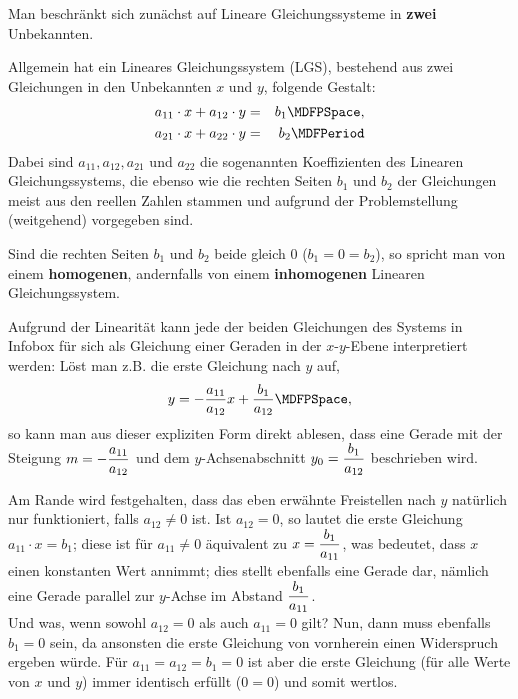 \begin{MIntro}
Man beschränkt sich zunächst auf Lineare Gleichungssysteme in \textbf{zwei}
Unbekannten.
\begin{MInfo}
Allgemein hat ein Lineares Gleichungssystem (LGS), bestehend aus zwei
Gleichungen in den Unbekannten $x$ und $y$, folgende Gestalt:
\begin{eqnarray*}
	a_{11} \cdot x + a_{12} \cdot y &=& b_{1} \MDFPSpace, \\ 
	a_{21} \cdot x + a_{22} \cdot y &=& b_2 \MDFPeriod
\end{eqnarray*}
Dabei sind $a_{11}, a_{12}, a_{21}$ und $a_{22}$ die sogenannten Koeffizienten des
Linearen Gleichungssystems,
die ebenso wie die rechten Seiten $b_1$ und $b_2$ der Gleichungen meist aus den reellen Zahlen stammen und
aufgrund der Problemstellung (weitgehend) vorgegeben sind.

Sind die rechten Seiten $b_1$ und $b_2$ beide gleich $0$ ($b_1 = 0 = b_2$), so spricht man von einem
\textbf{homogenen}, andernfalls von einem \textbf{inhomogenen} Linearen Gleichungssystem.

\end{MInfo}

Aufgrund der Linearität kann jede der beiden Gleichungen des Systems in Infobox  für sich als Gleichung
einer Geraden in der $x$-$y$-Ebene interpretiert werden: Löst man z.B. die erste Gleichung nach $y$ auf,
$$y = - \Mdfrac{a_{11}}{a_{12}} x + \Mdfrac{b_1}{a_{12}} \MDFPSpace ,$$
so kann man aus dieser expliziten Form direkt ablesen, dass eine Gerade mit der Steigung $m = - \dfrac{a_{11}}{a_{12}}$
und dem $y$-Achsenabschnitt $y_0 = \dfrac{b_1}{a_{12}}$ beschrieben wird.

Am Rande wird festgehalten, dass das eben erwähnte Freistellen nach $y$ natürlich
nur funktioniert, falls $a_{12} \neq 0$ ist. Ist $a_{12} = 0$,
so lautet die erste Gleichung $a_{11} \cdot x = b_1$; diese ist für $a_{11} \neq 0$ äquivalent zu
$x = \dfrac{b_1}{a_{11}}$, was bedeutet, dass $x$ einen konstanten Wert annimmt; dies stellt ebenfalls eine Gerade dar,
nämlich eine Gerade parallel zur $y$-Achse im Abstand $\dfrac{b_1}{a_{11}}$.\\
Und was, wenn sowohl $a_{12} = 0$ als auch
$a_{11} = 0$ gilt? Nun, dann muss ebenfalls $b_1 = 0$ sein, da ansonsten die erste Gleichung von vornherein
einen Widerspruch ergeben würde. Für $a_{11} = a_{12} = b_1 = 0$ ist aber die erste Gleichung (für alle
Werte von $x$ und $y$) immer identisch erfüllt ($0 = 0$) und somit wertlos.


\end{MIntro}
